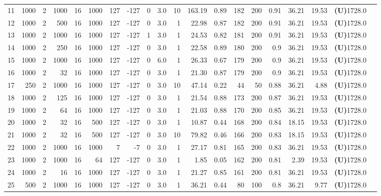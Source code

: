 \documentclass[english]{aghengthesis} %
\begin{document}
\begin{table}[!htbp]
\begin{tabular}{@{}r r r r r r r r r r r r r r r r r r r r@{}}
    11 & 1000 & 2 & 1000 & 16 & 1000 & 127 & -127 & 0 & 3.0 & 10 & 163.19 & 0.89 & 182 & 200 & 0.91 & 36.21 & 19.53 & \textbf{(U)}1728.0 \\
    12 & 1000 & 2 & 500 & 16 & 1000 & 127 & -127 & 0 & 3.0 & 1 & 22.98 & 0.87 & 182 & 200 & 0.91 & 36.21 & 19.53 & \textbf{(U)}1728.0 \\
    13 & 1000 & 2 & 1000 & 16 & 1000 & 127 & -127 & 1 & 3.0 & 1 & 24.53 & 0.82 & 181 & 200 & 0.91 & 36.21 & 19.53 & \textbf{(U)}1728.0 \\
    14 & 1000 & 2 & 250 & 16 & 1000 & 127 & -127 & 0 & 3.0 & 1 & 22.58 & 0.89 & 180 & 200 & 0.9 & 36.21 & 19.53 & \textbf{(U)}1728.0 \\
    15 & 1000 & 2 & 1000 & 16 & 1000 & 127 & -127 & 0 & 6.0 & 1 & 26.33 & 0.67 & 179 & 200 & 0.9 & 36.21 & 19.53 & \textbf{(U)}1728.0 \\
    16 & 1000 & 2 & 32 & 16 & 1000 & 127 & -127 & 0 & 3.0 & 1 & 21.30 & 0.87 & 179 & 200 & 0.9 & 36.21 & 19.53 & \textbf{(U)}1728.0 \\
    17 & 250 & 2 & 1000 & 16 & 1000 & 127 & -127 & 0 & 3.0 & 10 & 47.14 & 0.22 & 44 & 50 & 0.88 & 36.21 & 4.88 & \textbf{(U)}1728.0 \\
    18 & 1000 & 2 & 125 & 16 & 1000 & 127 & -127 & 0 & 3.0 & 1 & 21.54 & 0.88 & 173 & 200 & 0.87 & 36.21 & 19.53 & \textbf{(U)}1728.0 \\
    19 & 1000 & 2 & 64 & 16 & 1000 & 127 & -127 & 0 & 3.0 & 1 & 21.03 & 0.88 & 170 & 200 & 0.85 & 36.21 & 19.53 & \textbf{(U)}1728.0 \\
    20 & 1000 & 2 & 32 & 16 & 500 & 127 & -127 & 0 & 3.0 & 1 & 10.87 & 0.44 & 168 & 200 & 0.84 & 18.15 & 19.53 & \textbf{(U)}1728.0 \\
    21 & 1000 & 2 & 32 & 16 & 500 & 127 & -127 & 0 & 3.0 & 10 & 79.82 & 0.46 & 166 & 200 & 0.83 & 18.15 & 19.53 & \textbf{(U)}1728.0 \\
    22 & 1000 & 2 & 1000 & 16 & 1000 & 7 & -7 & 0 & 3.0 & 1 & 27.17 & 0.81 & 165 & 200 & 0.83 & 36.21 & 19.53 & \textbf{(U)}1728.0 \\
    23 & 1000 & 2 & 1000 & 16 & 64 & 127 & -127 & 0 & 3.0 & 1 & 1.85 & 0.05 & 162 & 200 & 0.81 & 2.39 & 19.53 & \textbf{(U)}1728.0 \\
    24 & 1000 & 2 & 16 & 16 & 1000 & 127 & -127 & 0 & 3.0 & 1 & 21.27 & 0.85 & 161 & 200 & 0.81 & 36.21 & 19.53 & \textbf{(U)}1728.0 \\
    25 & 500 & 2 & 1000 & 16 & 1000 & 127 & -127 & 0 & 3.0 & 1 & 36.21 & 0.44 & 80 & 100 & 0.8 & 36.21 & 9.77 & \textbf{(U)}1728.0 \\

\end{tabular}
\end{table}
\end{document}
